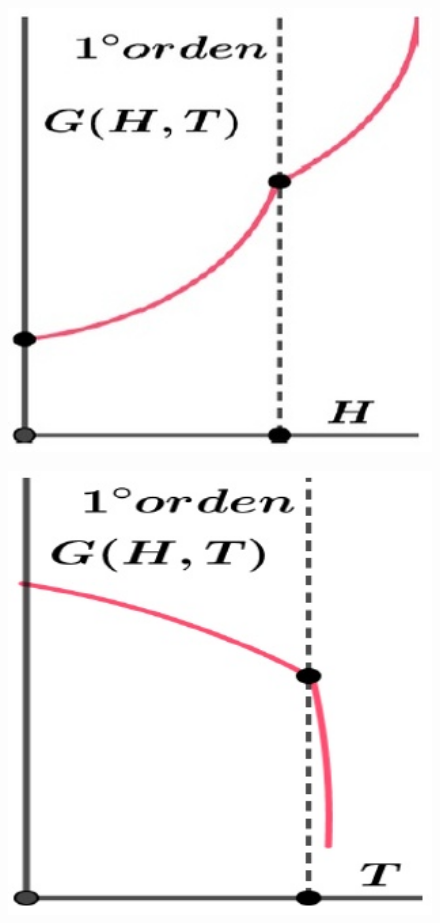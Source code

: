 \begin{figure}[H]
  \begin{minipage}[b]{0.30\textwidth}
    \includegraphics[width=1.0\textwidth]{./Figures/fig429}
	\label{fig:429}
  \end{minipage}
  \hfill
  \begin{minipage}[b]{0.30\textwidth}
    \includegraphics[width=1.0\textwidth]{./Figures/fig430}

\end{minipage}
\end{figure}
